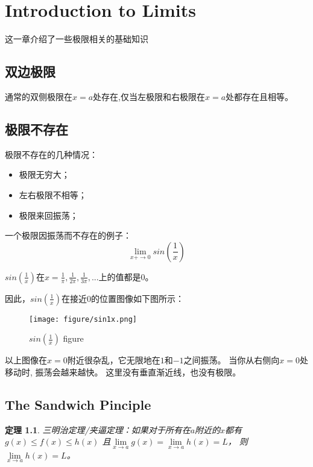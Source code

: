 \documentclass[11pt, b5paper, oneside]{book}
\newtheorem{theorem}{定理}[section]
\begin{document}
\chapter{Introduction to Limits}

这一章介绍了一些极限相关的基础知识

\section{双边极限}

通常的双侧极限在$x=a$处存在,仅当左极限和右极限在$x=a$处都存在且相等。

\section{极限不存在}

极限不存在的几种情况：
\begin{itemize}
\centering
    \item 极限无穷大；
    \item 左右极限不相等；
    \item 极限来回振荡；
\end{itemize}

一个极限因振荡而不存在的例子：
\[\lim\limits_{x+\to0} sin(\frac{1}{x})\]

$sin(\frac{1}{x})$在$x=\frac{1}{\pi},\frac{1}{2\pi},\frac{1}{3\pi},...$上的值都是0。

因此，$sin(\frac{1}{x})$在接近0的位置图像如下图所示：
\begin{figure}[H]
    \centering
    \texttt{[image: figure/sin1x.png]}
    \caption{$sin(\frac{1}{x})$ figure}
\end{figure}

以上图像在$x=0$附近很杂乱，它无限地在$1$和$-1$之间振荡。
当你从右侧向$x=0$处移动时, 振荡会越来越快。
这里没有垂直渐近线，也没有极限。

\section{The Sandwich Pinciple}

\begin{theorem}
    三明治定理/夹逼定理：如果对于所有在$a$附近的$x$都有
    $g(x)\leq f(x)\leq h(x)$
    且$\lim\limits_{x\to a}g(x) = \lim\limits_{x\to a}h(x) = L$，
    则$\lim\limits_{x\to a}h(x) = L$。
\end{theorem}
\end{document}
